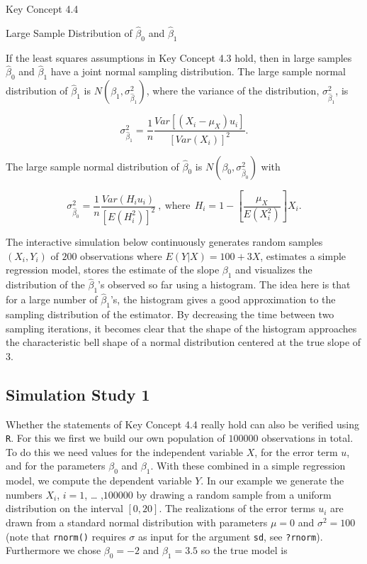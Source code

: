 \documentclass[]{book}
\theoremstyle{definition}
\theoremstyle{definition}
\theoremstyle{definition}
\theoremstyle{remark}
\begin{document}
Key Concept 4.4

Large Sample Distribution of \(\hat\beta_0\) and \(\hat\beta_1\)

If the least squares assumptions in Key Concept 4.3 hold, then in large
samples \(\hat\beta_0\) and \(\hat\beta_1\) have a joint normal sampling
distribution. The large sample normal distribution of \(\hat\beta_1\) is
\(N(\beta_1, \sigma^2_{\hat\beta_1})\), where the variance of the
distribution, \(\sigma^2_{\hat\beta_1}\), is

\[ \sigma^2_{\hat\beta_1} = \frac{1}{n} \frac{Var \left[ \left(X_i - \mu_X \right) u_i  \right]}  {\left[  Var \left(X_i \right)  \right]^2} \tag{4.1}. \]

The large sample normal distribution of \(\hat\beta_0\) is
\(N(\beta_0, \sigma^2_{\hat\beta_0})\) with

\[ \sigma^2_{\hat\beta_0} =  \frac{1}{n} \frac{Var \left( H_i u_i \right)}{ \left[  E \left(H_i^2  \right)  \right]^2 } \ , \ \text{where} \ \ H_i = 1 - \left[ \frac{\mu_X} {E \left( X_i^2\right)} \right] X_i. \tag{4.2} \]

The interactive simulation below continuously generates random samples
\((X_i,Y_i)\) of \(200\) observations where \(E(Y\vert X) = 100 + 3X\),
estimates a simple regression model, stores the estimate of the slope
\(\beta_1\) and visualizes the distribution of the
\(\widehat{\beta}_1\)'s observed so far using a histogram. The idea here
is that for a large number of \(\widehat{\beta}_1\)'s, the histogram
gives a good approximation to the sampling distribution of the
estimator. By decreasing the time between two sampling iterations, it
becomes clear that the shape of the histogram approaches the
characteristic bell shape of a normal distribution centered at the true
slope of \(3\).

\subsection*{Simulation Study 1}\label{simulation-study-1}

Whether the statements of Key Concept 4.4 really hold can also be
verified using \texttt{R}. For this we first we build our own population
of \(100000\) observations in total. To do this we need values for the
independent variable \(X\), for the error term \(u\), and for the
parameters \(\beta_0\) and \(\beta_1\). With these combined in a simple
regression model, we compute the dependent variable \(Y\). In our
example we generate the numbers \(X_i\), \(i = 1\), \ldots{} ,\(100000\)
by drawing a random sample from a uniform distribution on the interval
\([0,20]\). The realizations of the error terms \(u_i\) are drawn from a
standard normal distribution with parameters \(\mu = 0\) and
\(\sigma^2 = 100\) (note that \texttt{rnorm()} requires \(\sigma\) as
input for the argument \texttt{sd}, see \texttt{?rnorm}). Furthermore we
chose \(\beta_0 = -2\) and \(\beta_1 = 3.5\) so the true model is
\end{document}
